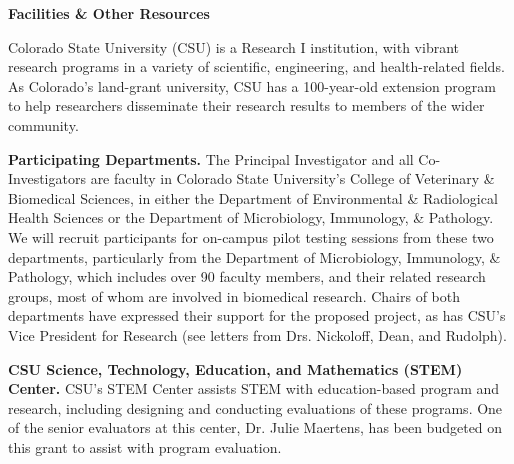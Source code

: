 \documentclass[pdftex,english,11.5pt,parskip=half]{scrartcl}
\begin{document}
\def\bf{\normalfont\bfseries}
\pagestyle{empty}

{\large \textbf{Facilities \& Other Resources}}

% 

Colorado State University (CSU) is a Research I institution, with vibrant research programs in a variety of scientific, engineering, and health-related fields. As Colorado’s land-grant university, CSU has a 100-year-old extension program to help researchers disseminate their research results to members of the wider community. 

\textbf{Participating Departments.} The Principal Investigator and all Co-Investigators are faculty in Colorado State University's College of Veterinary \& Biomedical Sciences, in either the Department of Environmental \& Radiological Health Sciences or the Department of Microbiology, Immunology, \& Pathology. We will recruit participants for on-campus pilot testing sessions from these two departments, particularly from the Department of Microbiology, Immunology, \& Pathology, which includes over 90 faculty members, and their related research groups, most of whom are involved in biomedical research. Chairs of both departments have expressed their support for the proposed project, as has CSU's Vice President for Research (see letters from Drs. Nickoloff, Dean, and Rudolph).

\textbf{CSU Science, Technology, Education, and Mathematics (STEM) Center.} CSU's STEM Center assists STEM with education-based program and research, including designing and conducting evaluations of these programs. One of the senior evaluators at this center, Dr. Julie Maertens, has been budgeted on this grant to assist with program evaluation.
\end{document}
